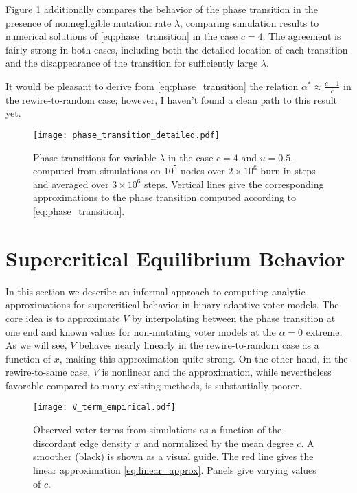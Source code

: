 \documentclass[english]{scrartcl}
\begin{document}
	Figure \ref{fig:transition_mutation} additionally compares the behavior of the phase transition in the presence of nonnegligible mutation rate $\lambda$, comparing simulation results to numerical solutions of \eqref{eq:phase_transition} in the case $c = 4$. The agreement is fairly strong in both cases, including both the detailed location of each transition and the disappearance of the transition for sufficiently large $\lambda$. 

	It would be pleasant to derive from \eqref{eq:phase_transition} the relation $\alpha^* \approx \frac{c-1}{c}$ in the rewire-to-random case; however, I haven't found a clean path to this result yet. 

	\begin{figure}
		\centering
		\texttt{[image: phase\_transition\_detailed.pdf]}
		\caption{Phase transitions for variable $\lambda$ in the case $c = 4$ and $u = 0.5$, computed from simulations on $10^5$ nodes over $2\times 10^6$ burn-in steps and averaged over $3 \times 10^6$ steps. Vertical lines give the corresponding  approximations to the phase transition computed according to \eqref{eq:phase_transition}.} \label{fig:transition_mutation}
	\end{figure}

\section{Supercritical Equilibrium Behavior}
	In this section we describe an informal approach to computing analytic approximations for supercritical behavior in binary adaptive voter models. The core idea is to approximate $V$ by interpolating between the phase transition at one end and known values for non-mutating voter models at the $\alpha = 0$ extreme. As we will see, $V$ behaves nearly linearly in the rewire-to-random case as a function of $x$, making this approximation quite strong. On the other hand, in the rewire-to-same case, $V$ is nonlinear and the approximation, while nevertheless favorable compared to many existing methods, is substantially poorer. 


	\begin{figure}
		\centering 
		\texttt{[image: V\_term\_empirical.pdf]}
		\caption{Observed voter terms from simulations as a function of the discordant edge density $x$ and normalized by the mean degree $c$. A smoother (black) is shown as a visual guide. The red line gives the linear approximation \eqref{eq:linear_approx}. Panels give varying values of $c$.} \label{fig:linear_approx}
	\end{figure}
\end{document}
